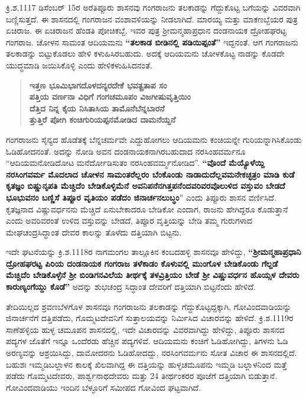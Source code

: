 ಕ್ರಿ.ಶ.1117 ಡಿಸೆಂಬರ್​ 15ರ ಅರೆತಿಪ್ಪೂರು ಶಾಸನವು ಗಂಗರಾಜನು ತಲಕಾಡನ್ನು ಗೆದ್ದುಕೊಟ್ಟ ಬಗೆಯನ್ನು ವಿವರವಾಗಿ ಬಣ್ಣಿಸುತ್ತದೆ. ಈ ಶಾಸನದಲ್ಲಿ ಗಂಗರಾಜನ ವಂಶಾವಳಿಯನ್ನು ನೀಡಲಾಗಿದೆ. ಮಾರಯ್ಯ ಮತ್ತು ಮಾಕಣಬ್ಬೆಯರ ಪುತ್ರ ಏಚಿರಾಜ. ಈ ಏಚಿರಾಜನ ಹೆಂಡತಿ ಪೋಚಿಕಬ್ಬೆ. ಇವರ ಪುತ್ರ ಶ‍್ರೀಮನ್ಮಹಾಪ್ರಧಾನ ದಂಡನಾಯಕ ದ್ರೋಹಘರಟ್ಟ ಗಂಗರಾಜ. ಚೋಳನ ಸಾಮಂತ ಆದಿಯಮನು \textbf{“ತಲಕಾಡ ಬೀಡಿನಲ್ಲಿ ಪಡಿಯಿಪ್ಪಂತೆ”} ಇದ್ದನಂತೆ. ಆಗ ಗಂಗರಾಜನು ತಲಕಾಡನ್ನು ಬಿಟ್ಟುಕೊಡಲು ಹೇಳಿ ಕಳುಹಿಸಿರಬಹುದು. ಅದಕ್ಕೆ ಆದಿಯಮನು ಚೋಳಕೊಟ್ಟ ನಾಡನ್ನು ಕೊಡದೇ ಯುದ್ಧಮಾಡಿ ಜಯಿಸಿಕೊಳ್ಳಿ ಎಂದು ಹೇಳಿಕಳುಹಿಸಿದನಂತೆ.

\begin{verse}
\textbf{ಇತ್ತಣ ಭೂಮಿಭಾಗದೊಳದನ್ಯರದೇಕೆ ಭವತ್ಪ್ರತಾಪ ಸಂ} \\\textbf{ಪತ್ತಿಯ ವರ್ಣನಾ ವಿಧಿಗೆ ಗಂಗಚಮೂಪಂ ವಿಜಗೀಷುವೃತ್ತಿಯಿಂ} \\\textbf{ದೆತ್ತಿದ ನಿನ್ನ ಕೈಯ ನಿಸಿತಾಸಿಯ ತಾಮೊನೆಬೆನ್ನಬಾರನೆ} \\\textbf{ತ್ತುತ್ತಿರೆ ಪೋಗಿ ಕಂಚಿಗುರಿಯಪ್ಪನಮೋಡಿದ ದಾಮನೆಯ್ದನೆ}
\end{verse}

ಗಂಗರಾಜನು ಸೈನ್ಯದ ಹೊಡೆತಕ್ಕೆ ಬೆನ್ನಚರ್ಮವೇ ಎದ್ದುಹೋಗಲು ಆದಿಯಮನು ಕಂಚಿಯನ್ನೇ ಗುರಿಯನ್ನಾಗಿಸಿ\-ಕೊಂಡು ಓಡಿಹೋದನಂತೆ. ಅದನ್ನು ನೋಡಿ ಅವನ ದಂಡನಾಯಕನಾಗಿರಬಹುದಾದ ನರಸಿಂಹವರ್ಮನೂ “ಆದಿಯಮ\-ನೋಡಿದೋಟ ಮನೆರ್ದೋಡಿಸುತಂ ನರಸಿಂಹವರ್ಮ್ಮನೋಡಿದ”. \textbf{“ವೊಂದೆ ಮೆಯ್ಯೊಳೆಯ್ದಿ ನರಸಿಂಗವರ್ಮ ಮೊದಲಾದ ಚೋಳನ ಸಾಮಂತರೆಲ್ಲರಂ ಬೆಂಕೊಂಡು ನಾಡಾದುದೆಲ್ಲವಮನೇಕಚ್ಛತ್ರಂ ಮಾಡಿ ಕುಡೆ ಕೃತಜ್ಞಂ ಬಿಷ್ಣುನೃಪತಿ ಮೆಚ್ಚಿದೆಂ ಬೇಡಿಕೊಳ್ಳಿಮೆನೆ ಅವನಿಪನೆನಗಿತ್ತಪನೆಂದವರಿವರವೊಲುಳಿದ ವಸ್ತುವಂ ಬೇಡದೆ ಭೂಭುವನಂ ಬಣ್ಣಿಸೆ ತಿಪ್ಪೂರ ವೃತಿಯಂ ಪಡೆದಂ\general{\break } ಜಿನಾರ್ಚನಲುಬ್ಧಂ}” ಎಂದು ತಿಪ್ಪೂರು ಶಾಸನ ವರ್ಣಿಸಿದೆ. ಕೃತಜ್ಞನಾದ ವಿಷ್ಣುವರ್ಧನನು ಮೆಚ್ಚಿದೆ ಏನುಬೇಕಾದರೂ ಬೇಡಿಕೋ ಎಂದಾಗ, ರಾಜನು ಹೇಗಿದ್ದರೂ ಕೊಡುತ್ತಾನೆ ಎಂದು ಅವರಿವರಂತೆ ಉಳಿದ ವಸ್ತುವನ್ನು ಬೇಡದೆ, ತಿಪ್ಪೂರ ವೃತ್ತಿಯನ್ನು ಬೇಡಿ ತಮ್ಮ ಗುರುಗಳಾದ ಮೇಘಚಂದ್ರಸಿದ್ಧಾಂತ ದೇವರ ಕಾಲನ್ನು ತೊಳೆದು ದತ್ತಿಯಾಗಿ ಬಿಟ್ಟನು.

ಇದೇ ಘಟನೆಯನ್ನು ಕ್ರಿ.ಶ.1118ರ ನಾಗಮಂಗಲ ತಾಲ್ಲೂಕಿನ ಕಂಬದಹಳ್ಳಿ ಶಾಸನವೂ ಹೇಳಿದ್ದು, \textbf{“ಶ‍್ರೀಮನ್ಮಹಾ\-ಪ್ರಧಾನಿ ದ್ರೋಹಘರಟ್ಟ ಪಿರಿಯ ದಂಡನಾಯಕ ಗಂಗರಾಜ ತಳೆಕಾಡಂ ಕೊಳುವಲ್ಲಿ ಮುಂಗೊಳ ಬೇಡಿಕೊಂಡು ಗೆಲ್ದಡೆ ಮೆಚ್ಚಿದೆಂ ಬೇಡಿಕೊಳ್ಳೆನೆ ಶ‍್ರೀ ಬಿಂಡಿಗನವಿಲೆಯ ತೀರ್ಥಕ್ಕೆ ತಳವ್ರಿತ್ತಿಯಂ ಬೇಡೆ ಶ‍್ರೀ ವಿಷ್ಣುವರ್ಧನ ಹೊಯ್ಸಳ ದೇವರು ಕಾರುಣ್ಯಂಗೆಯ್ದು ಕೊಡೆ” }ಅದನ್ನು ಶುಭಚಂದ್ರ ಸಿದ್ಧಾಂತ ದೇವರಿಗೆ ದತ್ತಿಯಾಗಿ ಬಿಟ್ಟನೆಂದು ಹೇಳಿದೆ.

ತೇದಿಯಿಲ್ಲದ ಶ್ರವಣಬೆಳಗೊಳ ಶಾಸನವೂ ಗಂಗರಾಜನು ತಲಕಾಡನ್ನು ಗೆದ್ದುಕೊಟ್ಟದ್ದಕ್ಕಾಗಿ, ಗೋವಿಂದವಾಡಿಯನ್ನು ಜಿನಾರ್ಚನೆಗೆ ದತ್ತಿಪಡೆದು, ಗೊಮ್ಮಟದೇವನಿಗೆ ಸುತ್ತಾಲಯವನ್ನು ನಿರ್ಮಿಸಿದ ವಿಚಾರವನ್ನು ಹೇಳಿದೆ. ಕ್ರಿ.ಶ.1119ರ ಸಾಣೆಹಳ್ಳಿಯ ಹುಳ್ಳ ಚಮೂಪನ ಶಾಸನದಲ್ಲಿ, ಇದೇ ವಿಚಾರವನ್ನು ವಿವರವಾಗಿದ್ದು ಹೇಳಿದ್ದು, ತಿಪ್ಪೂರು ಶಾಸನದ ಪದ್ಯಗಳ ಜೊತೆಗೆ ಇನ್ನೂ ಒಂದೆರಡು ಹೆಚ್ಚಿನ ಪದ್ಯಗಳಿವೆ. ಆದಿಯಮನು ಕಂಚಿಗೆ ಓಡಿಹೋಗಿದ್ದು, ತಿಗಳನು ಓಡಿ ಅರಣ್ಯವನ್ನು ಆಶ್ರಯಿಸಿದ್ದು, ದಾಮೋದರನು ಓಡಿಹೋದದ್ದು, ನರಸಿಂಗವರ್ಮನು ಸೋತ ವಿಚಾರ ಈ ಶಾಸನದಲ್ಲಿದೆ. ಬಹುಶಃ ಇಮ್ಮಡಿಬಲ್ಲಾಳನ ಕಾಲಕ್ಕೆ ಖಿಲವಾಗಿದ್ದ ಈ ದತ್ತಿಯನ್ನು ಹುಳ್ಳಚಮೂಪನು ಇಮ್ಮಡಿ ಬಲ್ಲಾಳನಿಂದ ಮತ್ತೆ ಪಡೆದು ಗೊಮ್ಮಟದೇವರು, ಪಾರ್ಶ್ವನಾಥದೇವರು ಮತ್ತು 24 ತೀರ್ಥಂಕರರ ಪೂಜೆಗೆ ದತ್ತಿಯಾಗಿ ಬಿಡುತ್ತಾನೆ. ಗೋವಿಂದವಾಡಿಯು ಇಂದಿನ ಬೆಳ್ಳೂರಿಗೆ ಸಮೀಪದ ಗೋವಿಂದ ಘಟ್ಟವಾಗಿದೆ.

